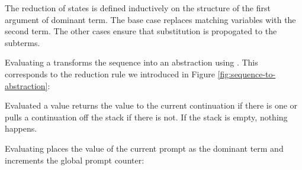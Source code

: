 The reduction of  states is defined inductively on the structure of the first argument of dominant term. The base case replaces matching variables with the second term. The other cases ensure that substitution is propogated to the subterms. 

Evaluating a  transforms the sequence into an abstraction using . This corresponds to the reduction rule we introduced in Figure \ref{fig:sequence-to-abstraction}:

Evaluated a value returns the value to the current continuation if there is one or pulls a continuation off the stack if there is not. If the stack is empty, nothing happens.

Evaluating  places the value of the current prompt as the dominant term and increments the global prompt counter:


